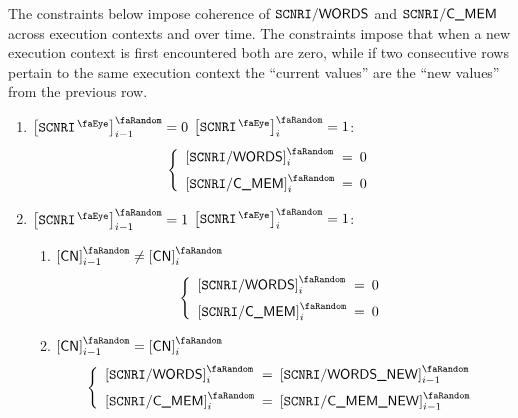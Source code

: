 The constraints below impose coherence of
$\texttt{SCNRI}\textsf{/}{\textsf{\textsf{WORDS}}}$ and
$\texttt{SCNRI}\textsf{/}{\textsf{\textsf{C\_MEM}}} $
across execution contexts and over time.
The constraints impose that when a new execution context is first encountered both are zero,
while if two consecutive rows pertain to the same execution context the ``current values'' are the ``new values'' from the previous row.
\begin{enumerate}
	\item
		\If $\order{\isMxpScenario} _{i - 1} = 0$
		\et $\order{\isMxpScenario} _{i}     = 1$:
		\Then
		\[
			\left\{ \begin{array}{lcl}
				\order{\mxpScenarioWords} _{i} & \!\!\! = \!\!\! & 0 \vspace{2mm} \\
				\order{\mxpScenarioCmem}  _{i} & \!\!\! = \!\!\! & 0              \\
			\end{array} \right.
		\]
	\item
		\If $\order{\isMxpScenario} _{i - 1} = 1$
		\et $\order{\isMxpScenario} _{i}     = 1$:
		\Then
		\begin{enumerate}
			\item \If $\order{\cn}_{i - 1} \neq \order{\cn}_{i}$ \Then
				\[
					\left\{ \begin{array}{lcl}
						\order{\mxpScenarioWords} _{i} & \!\!\! = \!\!\! & 0 \vspace{2mm} \\
						\order{\mxpScenarioCmem}  _{i} & \!\!\! = \!\!\! & 0 \\
					\end{array} \right.
				\]
			\item \If $\order{\cn}_{i - 1} = \order{\cn}_{i}$ \Then
				\[
					\left\{ \begin{array}{lcl}
						\order{\mxpScenarioWords} _{i} & \!\!\! = \!\!\! & \order{\mxpScenarioWordsNew} _{i - 1} \vspace{2mm} \\
						\order{\mxpScenarioCmem}  _{i} & \!\!\! = \!\!\! & \order{\mxpScenarioCmemNew } _{i - 1} \\
					\end{array} \right.
				\]
		\end{enumerate}
\end{enumerate}
